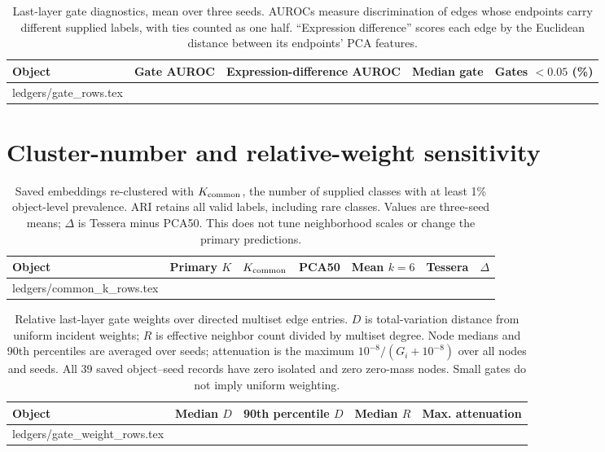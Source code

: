\documentclass[11pt]{article}
\makeatletter
\let\tableinput\@@input
\makeatother
\begin{document}
\begin{table}[ht]\centering\small\setlength{\tabcolsep}{7pt}
\caption{Last-layer gate diagnostics, mean over three seeds. AUROCs measure discrimination of edges whose endpoints carry different supplied labels, with ties counted as one half. ``Expression difference'' scores each edge by the Euclidean distance between its endpoints' PCA features.}
\begin{tabular}{lrrrr}\toprule
Object & Gate AUROC & Expression-difference AUROC & Median gate & Gates $<0.05$ (\%)\\\midrule
\tableinput ledgers/gate_rows.tex
\bottomrule\end{tabular}\end{table}
\clearpage
\section*{Cluster-number and relative-weight sensitivity}
\begin{table}[ht]\centering\small\setlength{\tabcolsep}{5pt}
\caption{Saved embeddings re-clustered with \(K_{\rm common}\), the number of supplied classes with at least 1\% object-level prevalence. ARI retains all valid labels, including rare classes. Values are three-seed means; \(\Delta\) is Tessera minus PCA50. This does not tune neighborhood scales or change the primary predictions.}\label{tab:common-k}
\begin{tabular}{lrrrrrr}\toprule
Object & Primary $K$ & $K_{\rm common}$ & PCA50 & Mean $k=6$ & Tessera & $\Delta$\\\midrule
\tableinput ledgers/common_k_rows.tex
\bottomrule\end{tabular}\end{table}
\begin{table}[ht]\centering\small\setlength{\tabcolsep}{6pt}
\caption{Relative last-layer gate weights over directed multiset edge entries. \(D\) is total-variation distance from uniform incident weights; \(R\) is effective neighbor count divided by multiset degree. Node medians and 90th percentiles are averaged over seeds; attenuation is the maximum \(10^{-8}/(G_i+10^{-8})\) over all nodes and seeds. All 39 saved object--seed records have zero isolated and zero zero-mass nodes. Small gates do not imply uniform weighting.}\label{tab:gate-weights}
\begin{tabular}{lrrrr}\toprule
Object & Median $D$ & 90th percentile $D$ & Median $R$ & Max. attenuation\\\midrule
\tableinput ledgers/gate_weight_rows.tex
\bottomrule\end{tabular}\end{table}
\clearpage
\end{document}
